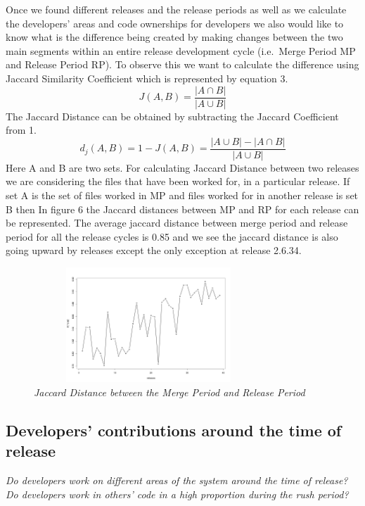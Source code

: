 \documentclass{acm_proc_article-sp}
\begin{document}
Once we found different releases and the release periods as well as we calculate the developers' areas and code ownerships for developers we also would like to know what is the difference being created by making changes between the two main segments within an entire release development cycle (i.e.\ Merge Period MP and Release Period RP). To observe this we want to calculate the difference using Jaccard Similarity Coefficient \cite{jaccard_alpine} which is represented by equation 3.
\begin{equation} J(A, B) =\frac{|A \cap B|}{|A \cup B|} \end{equation}
The Jaccard Distance can be obtained by subtracting the Jaccard Coefficient from 1.
\begin{equation} d_j(A, B) = 1 - J(A, B) = \frac{|A \cup B|-|A \cap B|}{|A \cup B|} \end{equation}
Here A and B are two sets. For calculating Jaccard Distance between two releases we are considering the files that have been worked for, in a particular release. If set A is the set of files worked in MP and files worked for in another release is set B then In figure 6 the Jaccard distances between MP and RP for each release can be represented. The average jaccard distance between merge period and release period for all the release cycles is 0.85 and we see the jaccard distance is also going upward by releases except the only exception at release 2.6.34.

\begin{figure}
\begin{center}
\includegraphics[height=1.7in,width=3.4in]{jdMPRP.png}
\caption{\small \sl Jaccard Distance between the Merge Period and Release Period}
\end{center}
\end{figure}

\subsection{Developers' contributions around the time of release}
\textit{Do developers work on different areas of the system around the time of release?}\newline
\textit{Do developers work in others' code in a high proportion during the rush period?}
\end{document}

